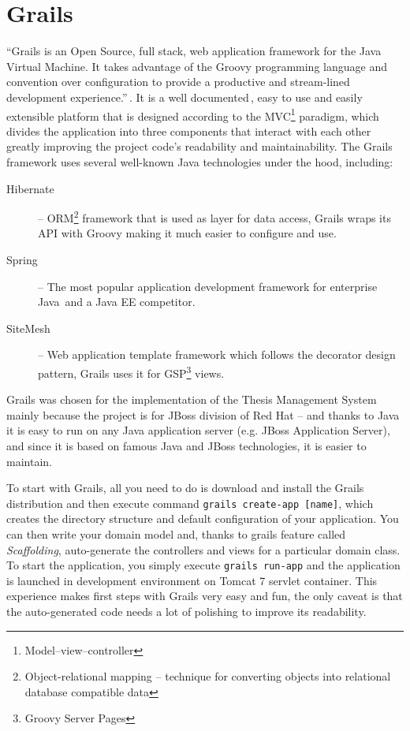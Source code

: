 \section{Grails}

``Grails is an Open Source, full stack, web application framework for the Java Virtual Machine. It takes advantage of the Groovy programming language and convention over configuration to provide a productive and stream-lined development experience.''\,\cite{grails-homepage}. It is a well documented\,\cite{grails-documentation}, easy to use and easily extensible platform that is designed according to the MVC\footnote{Model--view--controller} paradigm, which divides the application into three components that interact with each other greatly improving the project code's readability and maintainability. The Grails framework uses several well-known Java technologies under the hood, including:

\begin{description}
    \item[Hibernate] -- ORM\footnote{Object-relational mapping -- technique for converting objects into relational database compatible data} framework that is used as layer for data access, Grails wraps its API with Groovy making it much easier to configure and use.
    \item[Spring] -- The most popular application development framework for enterprise Java\,\cite{springsource-homepage} and a Java EE competitor.
    \item[SiteMesh] -- Web application template framework which follows the decorator design pattern, Grails uses it for GSP\footnote{Groovy Server Pages} views.
\end{description}

Grails was chosen for the implementation of the Thesis Management System mainly because the project is for JBoss division of Red Hat -- and thanks to Java it is easy to run on any Java application server (e.g. JBoss Application Server), and since it is based on famous Java and JBoss technologies, it is easier to maintain. 

To start with Grails, all you need to do is download and install the Grails distribution and then execute command \texttt{grails create-app [name]}, which creates the directory structure and default configuration of your application. You can then write your domain model and, thanks to grails feature called \emph{Scaffolding}, auto-generate the controllers and views for a particular domain class. To start the application, you simply execute \texttt{grails run-app} and the application is launched in development environment on Tomcat 7 servlet container. This experience makes first steps with Grails very easy and fun, the only caveat is that the auto-generated code needs a lot of polishing to improve its readability.

